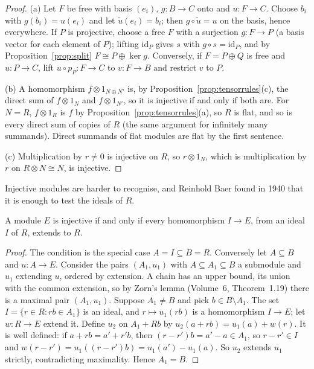 \begin{proof}
(a) Let $F$ be free with basis $(e_i)$, $g\colon B\to C$ onto and $u\colon F\to C$. Choose $b_i$ with $g(b_i)=u(e_i)$ and let $\tilde u(e_i)=b_i$; then $g\circ\tilde u=u$ on the basis, hence everywhere. If $P$ is projective, choose a free $F$ with a
surjection $g\colon F\to P$ (a basis vector for each element of $P$); lifting $\mathrm{id}_P$ gives $s$ with $g\circ s=\mathrm{id}_P$, and by Proposition~\ref{prop:split} $F\cong P\oplus\ker g$. Conversely, if $F=P\oplus Q$ is free and $u\colon P\to C$, lift
$u\circ p_P\colon F\to C$ to $v\colon F\to B$ and restrict $v$ to $P$.

(b) A homomorphism $f\otimes1_{N\oplus N'}$ is, by Proposition~\ref{prop:tensorrules}(c), the direct sum of $f\otimes1_N$ and $f\otimes1_{N'}$, so it is injective if and only if both are. For $N=R$, $f\otimes1_R$ is $f$ by
Proposition~\ref{prop:tensorrules}(a), so $R$ is flat, and so is every direct sum of copies of $R$ (the same argument for infinitely many summands). Direct summands of flat modules are flat by the first sentence.

(c) Multiplication by $r\ne0$ is injective on $R$, so $r\otimes1_N$, which is multiplication by $r$ on $R\otimes N\cong N$, is injective.
\end{proof}

Injective modules are harder to recognise, and Reinhold Baer found in 1940 that it is enough to test the ideals of $R$.

\begin{theorem}\label{thm:baer}
A module $E$ is injective if and only if every homomorphism $I\to E$, from an ideal $I$ of $R$, extends to $R$.
\end{theorem}

\begin{proof}
The condition is the special case $A=I\subseteq B=R$. Conversely let $A\subseteq B$ and $u\colon A\to E$. Consider the pairs $(A_1,u_1)$ with $A\subseteq A_1\subseteq B$ a submodule and $u_1$ extending $u$, ordered by extension. A chain has an upper bound,
its union with the common extension, so by Zorn's lemma (Volume~6, Theorem~1.19) there is a maximal pair $(A_1,u_1)$. Suppose $A_1\ne B$ and pick $b\in B\setminus A_1$. The set $I=\{r\in R:rb\in A_1\}$ is an ideal, and $r\mapsto u_1(rb)$ is a
homomorphism $I\to E$; let $w\colon R\to E$ extend it. Define $u_2$ on $A_1+Rb$ by $u_2(a+rb)=u_1(a)+w(r)$. It is well defined: if $a+rb=a'+r'b$, then $(r-r')b=a'-a\in A_1$, so $r-r'\in I$ and $w(r-r')=u_1((r-r')b)=u_1(a')-u_1(a)$. So $u_2$
extends $u_1$ strictly, contradicting maximality. Hence $A_1=B$.
\end{proof}

